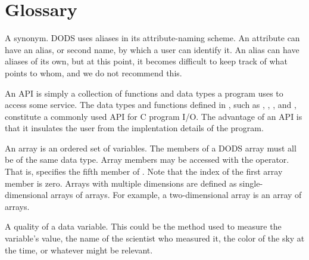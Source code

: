 %
%
%

\chapter*{Glossary}

\texorhtml
{\newcommand{\glosshead}[1]{%
  \vspace{8pt}\par\noindent\textbf{#1}\normalfont\vspace{2pt}}}%
{\newcommand{\glosshead}[1]{\html{h4}#1\html{/h4}}}


A synonym.  DODS uses aliases in its attribute-naming scheme.  An
attribute can have an alias, or second name, by which a user can
identify it.  An alias can have aliases of its own, but at this point,
it becomes difficult to keep track of what points to whom, and we do
not recommend this.


An API is simply a collection of functions and data types a program
uses to access some service. The data types and functions defined in
, such as , , , and
, constitute a commonly used API for C program I/O.  The
advantage of an API is that it insulates the user from the
implentation details of the program.


An array is an ordered set of variables. The members of a DODS array
must all be of the same data type. Array members may be accessed with
the \lit{[]} operator. That is,  specifies the fifth
member of .  Note that the index of the first array member
is zero. Arrays with multiple dimensions are defined as
single-dimensional arrays of arrays. For example, a two-dimensional
array is an array of arrays.


A quality of a data variable.  This could be the method used to
measure the variable's value, the name of the scientist who measured
it, the color of the sky at the time, or whatever might be relevant.



